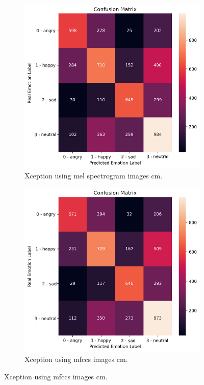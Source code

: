\begin{figure}[H]
	\begin{subfigure}{.5\textwidth}
		\centering
		\includegraphics[width=.9\linewidth]{figs/appendix/feature_selection/XMelSpec.png}
		\caption{Xception using mel spectrogram images \ac{cm}.}
	\end{subfigure}%
	\begin{subfigure}{.5\textwidth}
		\centering
		\includegraphics[width=.9\linewidth]{figs/appendix/feature_selection/XMFCC.png}
		\caption{Xception using \ac{mfccs} images \ac{cm}.}

\end{subfigure}
\end{figure}
